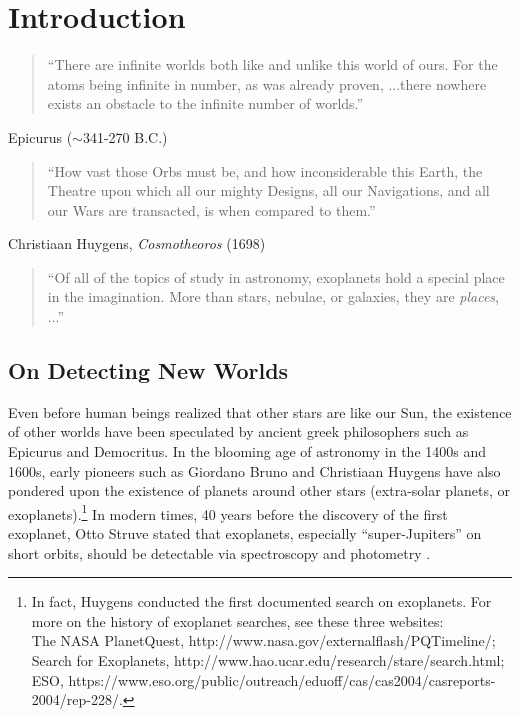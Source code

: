 \chapter{Introduction}

\begin{quote}
``There are infinite worlds both like and unlike this world of
ours. For the atoms being infinite in number, as was already proven,
...there nowhere exists an obstacle to the infinite number of worlds.''
\end{quote}
\hfill Epicurus ($\sim$341-270 B.C.)

\begin{quote}
``How vast those Orbs must be, and how inconsiderable this Earth, the
Theatre upon which all our mighty Designs, all our Navigations, and
all our Wars are transacted, is when compared to them.''
\end{quote}
\hfill Christiaan Huygens, {\it Cosmotheoros} (1698)

\begin{quote}
``Of all of the topics of study in astronomy, exoplanets hold a
special place in the imagination. More than stars, nebulae, or
galaxies, they are {\it places}, ...''
\end{quote}
\hfill \cite{2006PhDT.........8W}

\section{On Detecting New Worlds}

Even before human beings realized that other stars are like our Sun,
the existence of other worlds have been speculated by ancient greek
philosophers such as Epicurus and Democritus. In the blooming age of
astronomy in the 1400s and 1600s, early pioneers such as Giordano
Bruno and Christiaan Huygens have also pondered upon the existence of
planets around other stars (extra-solar planets, or
exoplanets).\footnote{In fact, Huygens conducted the first documented
search on exoplanets. For more on the history of exoplanet searches,
see these three websites:\\ The NASA PlanetQuest,
http://www.nasa.gov/externalflash/PQTimeline/; \\ Search for
Exoplanets, http://www.hao.ucar.edu/research/stare/search.html; \\
ESO,
https://www.eso.org/public/outreach/eduoff/cas/cas2004/casreports-2004/rep-228/. }
In modern times, 40 years before the discovery of the first exoplanet,
Otto Struve stated that exoplanets, especially ``super-Jupiters'' on
short orbits, should be detectable via spectroscopy and photometry
\citep{1952Obs....72..199S}.

